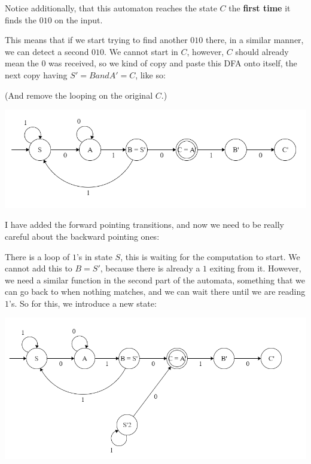 Notice additionally, that this automaton reaches the state $C$ the \textbf{first time} it finds the $010$ on the input.

This means that if we start trying to find another $010$ there, in a similar manner, we can detect a second $010$. We cannot start in $C$, however, $C$ should already mean the $0$ was received, so we kind of copy and paste this DFA onto itself, the next copy having $S' = B and A' = C$, like so:

(And remove the looping on the original $C$.)

\begin{center}
    \includegraphics[width=\linewidth]{./exams/misc/02/step_2.png}
\end{center}

I have added the forward pointing transitions, and now we need to be really careful about the backward pointing ones:

There is a loop of $1$'s in state $S$, this is waiting for the computation to start. We cannot add this to $B=S'$, because there is already a $1$ exiting from it. However, we need a similar function in the second part of the automata, something that we can go back to when nothing matches, and we can wait there until we are reading $1$'s. So for this, we introduce a new state:

\begin{center}
    \includegraphics[width=\linewidth]{./exams/misc/02/step_3.png}
\end{center}

